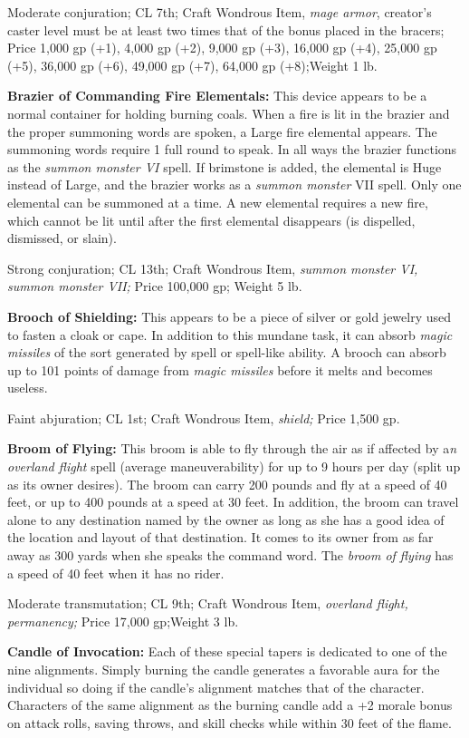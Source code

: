 \documentclass{article}
\begin{document}
Moderate conjuration; CL 7th; Craft Wondrous Item, \textit{mage armor}, creator's 
caster level must be at least two times that of the bonus placed in the bracers; 
Price 1,000 gp (+1), 4,000 gp (+2), 9,000 gp (+3), 16,000 gp (+4), 25,000 gp (+5), 
36,000 gp (+6), 49,000 gp (+7), 64,000 gp (+8);Weight 1 lb.

\textbf{Brazier of Commanding Fire Elementals: }This device appears to be a normal 
container for holding burning coals. When a fire is lit in the brazier and the 
proper summoning words are spoken, a Large fire elemental appears. The summoning 
words require 1 full round to speak. In all ways the brazier functions as the \textit{summon 
monster VI }spell. If brimstone is added, the elemental is Huge instead of Large, 
and the brazier works as a \textit{summon monster }VII spell. Only one elemental 
can be summoned at a time. A new elemental requires a new fire, which cannot be 
lit until after the first elemental disappears (is dispelled, dismissed, or slain).

Strong conjuration; CL 13th; Craft Wondrous Item, \textit{summon monster VI, summon 
monster VII; }Price 100,000 gp; Weight 5 lb.

\textbf{Brooch of Shielding: }This appears to be a piece of silver or gold jewelry 
used to fasten a cloak or cape. In addition to this mundane task, it can absorb 
\textit{magic missiles }of the sort generated by spell or spell-like ability. A 
brooch can absorb up to 101 points of damage from \textit{magic missiles }before 
it melts and becomes useless.

Faint abjuration; CL 1st; Craft Wondrous Item, \textit{shield; }Price 1,500 gp.

\textbf{Broom of Flying:} This broom is able to fly through the air as if affected 
by a\textit{n overland flight }spell (average maneuverability) for up to 9 hours 
per day (split up as its owner desires). The broom can carry 200 pounds and fly 
at a speed of 40 feet, or up to 400 pounds at a speed at 30 feet. In addition, 
the broom can travel alone to any destination named by the owner as long as she 
has a good idea of the location and layout of that destination. It comes to its 
owner from as far away as 300 yards when she speaks the command word. The \textit{broom 
of flying }has a speed of 40 feet when it has no rider.

Moderate transmutation; CL 9th; Craft Wondrous Item, \textit{overland flight, permanency; 
}Price 17,000 gp;Weight 3 lb.

\textbf{Candle of Invocation: }Each of these special tapers is dedicated to one 
of the nine alignments. Simply burning the candle generates a favorable aura for 
the individual so doing if the candle's alignment matches that of the character. 
Characters of the same alignment as the burning candle add a +2 morale bonus on 
attack rolls, saving throws, and skill checks while within 30 feet of the flame.
\end{document}
